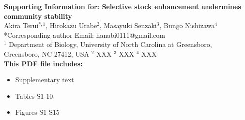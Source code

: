 \begin{flushleft}
\LARGE{\textbf{Supporting Information for: \newline Selective stock enhancement undermines community stability}}\\
\vspace*{\baselineskip}
\large{Akira Terui$^{*,1}$, Hirokazu Urabe$^2$, Masayuki Senzaki$^3$, Bungo Nishizawa$^4$}\\
\vspace*{1\baselineskip}
\normalsize{*Corresponding author \newline Email: hanabi0111@gmail.com}\\
\vspace*{1\baselineskip}
\normalsize{
$^1$ Department of Biology, University of North Carolina at Greensboro, Greensboro, NC 27412, USA \newline
$^2$ XXX \newline
$^3$ XXX \newline
$^4$ XXX}\\
\vspace*{2\baselineskip}
\textbf{This PDF file includes:}
\begin{itemize}
\item Supplementary text
\item Tables S1-10
\item Figures S1-S15
\end{itemize}
\end{flushleft}

\newpage